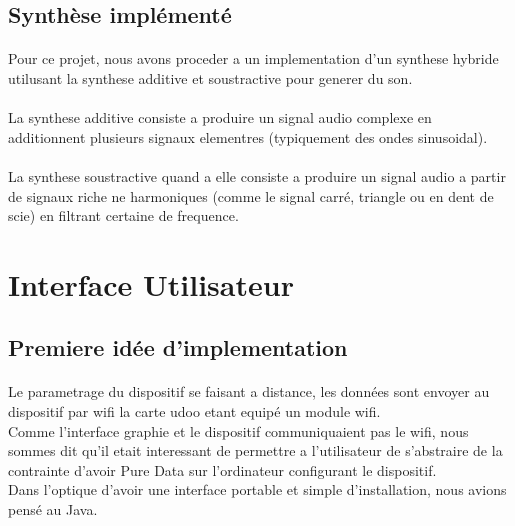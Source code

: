 \documentclass[a4paper, titlepage, oneside, 12pt]{article}%
\begin{document}
\subsection{Synthèse implémenté}
\paragraph{}
Pour ce projet, nous avons proceder a un implementation d'un synthese hybride utilusant la synthese additive et soustractive pour generer du son.\
\paragraph{}
La synthese additive consiste a produire un signal audio complexe en additionnent plusieurs signaux elementres (typiquement des ondes sinusoidal).
\paragraph{}
La synthese soustractive quand a elle consiste a produire un signal audio a partir de signaux riche ne harmoniques (comme le signal carré, triangle ou en dent de scie) en filtrant certaine de frequence. 


\section{Interface Utilisateur}
\subsection{Premiere idée d'implementation}
\paragraph{}
Le parametrage du dispositif se faisant a distance, les données sont envoyer au dispositif par wifi la carte udoo etant equipé un module wifi.\\
Comme l'interface graphie et le dispositif communiquaient pas le wifi, nous sommes dit qu'il etait interessant de permettre a l'utilisateur de s'abstraire de la contrainte d'avoir Pure Data sur l'ordinateur configurant le dispositif. \\
Dans l'optique d'avoir une interface portable et simple d'installation, nous avions pensé au Java.
\end{document}
